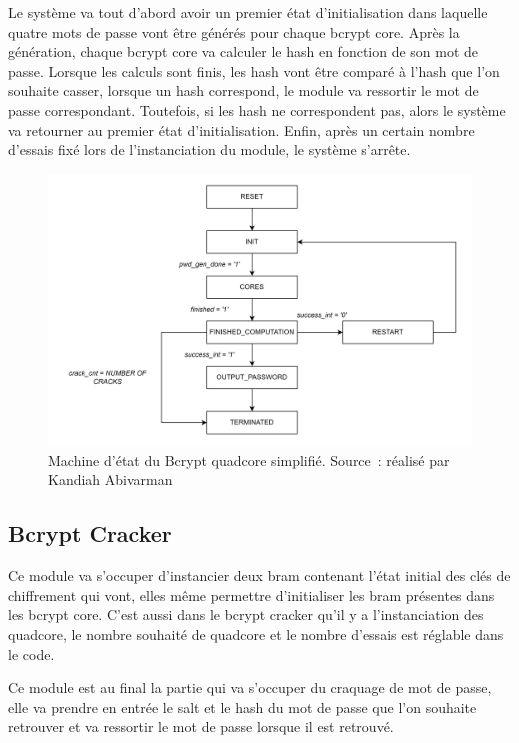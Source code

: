 Le système va tout d'abord avoir un premier état d'initialisation dans laquelle quatre mots de passe vont être générés pour chaque bcrypt core. 
Après la génération, chaque bcrypt core va calculer le hash en fonction de son mot de passe. 
Lorsque les calculs sont finis, les hash vont être comparé à l'hash que l'on souhaite casser, lorsque un hash correspond, le module va ressortir le mot de passe correspondant.
Toutefois, si les hash ne correspondent pas, alors le système va retourner au premier état d'initialisation. 
Enfin, après un certain nombre d'essais fixé lors de l'instanciation du module, le système s'arrête.

\newpage

\begin{figure}[tbph!]
	\centering
	\includegraphics[width=0.7\linewidth]{bcrypt_quad_simplified_fsm}
	\caption[Machine d'état Bcrypt quadcore simplifié]{Machine d'état du Bcrypt quadcore simplifié. Source : réalisé par Kandiah Abivarman}
	\label{fig:bcrypt_quad_simplified_fsm}
\end{figure}

\subsection{Bcrypt Cracker}

Ce module va s'occuper d'instancier deux \gls{bram} contenant l'état initial des clés de chiffrement qui vont, elles même permettre d'initialiser les \gls{bram} présentes dans les bcrypt core. 
C'est aussi dans le bcrypt cracker qu'il y a l'instanciation des quadcore, le nombre souhaité de quadcore et le nombre d'essais est réglable dans le code.

Ce module est au final la partie qui va s'occuper du craquage de mot de passe, elle va prendre en entrée le salt et le hash du mot de passe que l'on souhaite retrouver et va ressortir le mot de passe lorsque il est retrouvé.  

